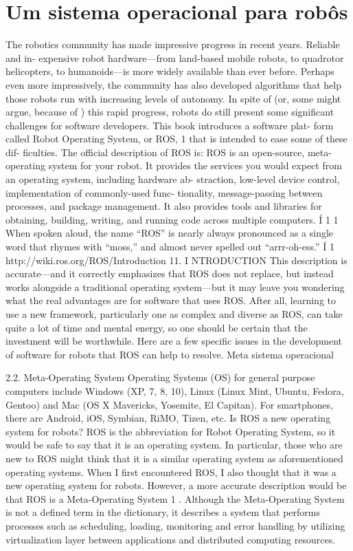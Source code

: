 \section{Um sistema operacional para robôs}

The robotics community has made impressive progress in recent years. Reliable and in-
expensive robot hardware—from land-based mobile robots, to quadrotor helicopters, to
humanoids—is more widely available than ever before. Perhaps even more impressively,
the community has also developed algorithms that help those robots run with increasing
levels of autonomy.
In spite of (or, some might argue, because of ) this rapid progress, robots do still present
some significant challenges for software developers. This book introduces a software plat-
form called Robot Operating System, or ROS, 1 that is intended to ease some of these dif-
ficulties. The official description of ROS is:
ROS is an open-source, meta-operating system for your robot. It provides the
services you would expect from an operating system, including hardware ab-
straction, low-level device control, implementation of commonly-used func-
tionality, message-passing between processes, and package management. It
also provides tools and libraries for obtaining, building, writing, and running
code across multiple computers. Í 1
1 When spoken aloud, the name “ROS” is nearly always pronounced as a single word that rhymes with
“moss,” and almost never spelled out “arrr-oh-ess.”
Í 1 http://wiki.ros.org/ROS/Introduction
11. I NTRODUCTION
This description is accurate—and it correctly emphasizes that ROS does not replace, but
instead works alongside a traditional operating system—but it may leave you wondering
what the real advantages are for software that uses ROS. After all, learning to use a new
framework, particularly one as complex and diverse as ROS, can take quite a lot of time
and mental energy, so one should be certain that the investment will be worthwhile. Here
are a few specific issues in the development of software for robots that ROS can help to
resolve.
Meta sistema operacional

2.2. Meta-Operating System
Operating Systems (OS) for general purpose computers include Windows (XP, 7, 8, 10), Linux
(Linux Mint, Ubuntu, Fedora, Gentoo) and Mac (OS X Mavericks, Yosemite, El Capitan). For
smartphones, there are Android, iOS, Symbian, RiMO, Tizen, etc.
Is ROS a new operating system for robots?
ROS is the abbreviation for Robot Operating System, so it would be safe to say that it is an
operating system. In particular, those who are new to ROS might think that it is a similar
operating system as aforementioned operating systems. When I first encountered ROS, I also
thought that it was a new operating system for robots.
However, a more accurate description would be that ROS is a Meta-Operating System 1 .
Although the Meta-Operating System is not a defined term in the dictionary, it describes a system
that performs processes such as scheduling, loading, monitoring and error handling by utilizing
virtualization layer between applications and distributed computing resources.


